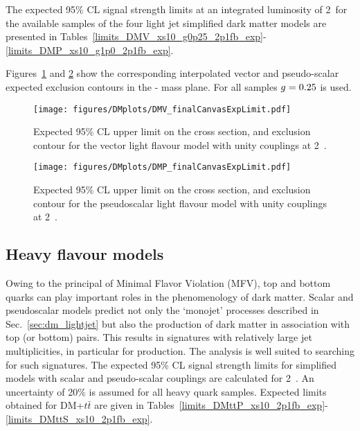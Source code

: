 The expected 95\% CL signal strength limits at an integrated luminosity of 2~\ifb for the available samples of the four light jet simplified dark matter models are
presented in Tables~\ref{limits_DMV_xs10_g0p25_2p1fb_exp}-\ref{limits_DMP_xs10_g1p0_2p1fb_exp}. 


Figures~\ref{fig:dm_A_g1_2fb_2dlimits} and \ref{fig:dm_P_g1_2fb_2dlimits} show the corresponding interpolated vector and pseudo-scalar expected exclusion 
contours in the {\mphi-\mchi} mass plane. For all samples $g_{\rm}=0.25$ is used. 


 
 
 


\begin{figure}
\begin{center}
\texttt{[image: figures/DMplots/DMV\_finalCanvasExpLimit.pdf]} \\
\caption{Expected 95\% CL upper limit on the cross section, and exclusion
contour for the vector light flavour model with unity couplings at 2~\ifb.}
\label{fig:dm_A_g1_2fb_2dlimits}
\end{center}
\end{figure}




\begin{figure}
\begin{center}
\texttt{[image: figures/DMplots/DMP\_finalCanvasExpLimit.pdf]} \\
\caption{Expected 95\% CL upper limit on the cross section, and exclusion
contour for the pseudoscalar light flavour model with unity couplings at 2~\ifb.}
\label{fig:dm_P_g1_2fb_2dlimits}
\end{center}
\end{figure}


 \subsection{Heavy flavour models} \label{sec:dm_heavyjet}

Owing to the principal of Minimal Flavor Violation (MFV), top and bottom quarks can play important roles in the phenomenology of dark matter. Scalar and
pseudoscalar models predict not only the `monojet' processes described in Sec.~\ref{sec:dm_lightjet} but also the production of dark matter in association
with top (or bottom) pairs. This results in signatures with relatively large jet multiplicities, in particular for \DMtt production. The \alphat analysis is well 
suited to searching for such signatures.  The expected 95\% CL signal strength limits for simplified \DMtt models with scalar and
pseudo-scalar couplings are calculated for 2~\ifb. An uncertainty of 20\% is assumed for all heavy quark samples.
Expected limits obtained for DM+$t\bar{t}$ are given in Tables~\ref{limits_DMttP_xs10_2p1fb_exp}-\ref{limits_DMttS_xs10_2p1fb_exp}.

